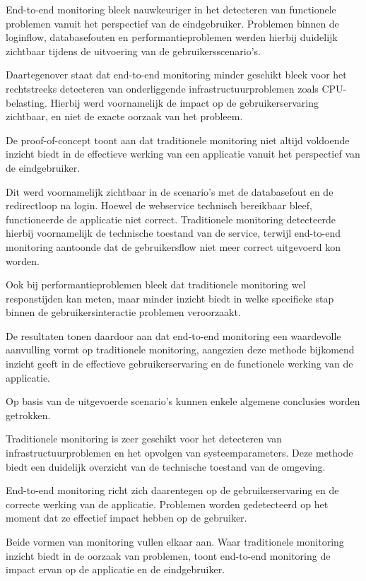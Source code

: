 End-to-end monitoring bleek nauwkeuriger in het detecteren van functionele problemen vanuit het perspectief van de eindgebruiker. Problemen binnen de loginflow, databasefouten en performantieproblemen werden hierbij duidelijk zichtbaar tijdens de uitvoering van de gebruikersscenario’s.

Daartegenover staat dat end-to-end monitoring minder geschikt bleek voor het rechtstreeks detecteren van onderliggende infrastructuurproblemen zoals CPU-belasting. Hierbij werd voornamelijk de impact op de gebruikerservaring zichtbaar, en niet de exacte oorzaak van het probleem.

De proof-of-concept toont aan dat traditionele monitoring niet altijd voldoende inzicht biedt in de effectieve werking van een applicatie vanuit het perspectief van de eindgebruiker.

Dit werd voornamelijk zichtbaar in de scenario’s met de databasefout en de redirectloop na login. Hoewel de webservice technisch bereikbaar bleef, functioneerde de applicatie niet correct. Traditionele monitoring detecteerde hierbij voornamelijk de technische toestand van de service, terwijl end-to-end monitoring aantoonde dat de gebruikersflow niet meer correct uitgevoerd kon worden.

Ook bij performantieproblemen bleek dat traditionele monitoring wel responstijden kan meten, maar minder inzicht biedt in welke specifieke stap binnen de gebruikersinteractie problemen veroorzaakt.

De resultaten tonen daardoor aan dat end-to-end monitoring een waardevolle aanvulling vormt op traditionele monitoring, aangezien deze methode bijkomend inzicht geeft in de effectieve gebruikerservaring en de functionele werking van de applicatie.

Op basis van de uitgevoerde scenario’s kunnen enkele algemene conclusies worden getrokken.

Traditionele monitoring is zeer geschikt voor het detecteren van infrastructuurproblemen en het opvolgen van systeemparameters. Deze methode biedt een duidelijk overzicht van de technische toestand van de omgeving.

End-to-end monitoring richt zich daarentegen op de gebruikerservaring en de correcte werking van de applicatie. Problemen worden gedetecteerd op het moment dat ze effectief impact hebben op de gebruiker.

Beide vormen van monitoring vullen elkaar aan. Waar traditionele monitoring inzicht biedt in de oorzaak van problemen, toont end-to-end monitoring de impact ervan op de applicatie en de eindgebruiker.


